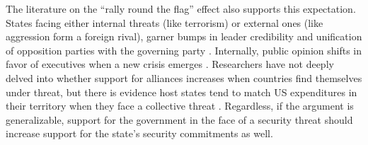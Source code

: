 






The literature on the ``rally round the flag'' effect also supports this expectation. States facing either internal threats (like terrorism) or external ones (like aggression form a foreign rival), garner bumps in leader credibility and unification of opposition parties with the governing party \cite{Chowanietz2011}. Internally, public opinion shifts in favor of executives when a new crisis emerges \cite{lee1977,Norrander1993}.  Researchers have not deeply delved into whether support for alliances increases when countries find themselves under threat, but there is evidence host states tend to match US expenditures in their territory when they face a collective threat \cite{allenetal2016}. Regardless, if the argument is generalizable, support for the government in the face of a security threat should increase support for the state's security commitments as well.




